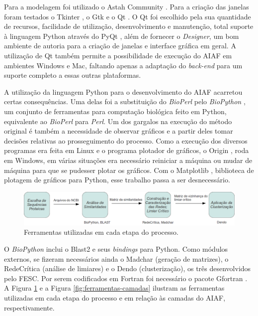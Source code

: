 Para a modelagem foi utilizado o Astah Community \cite{astah}. Para a criação das janelas foram testados o Tkinter \cite{python}, o Gtk \cite{gtk}
e o Qt \cite{qt}. O Qt foi escolhido pela sua quantidade de recursos, facilidade de utilização, desenvolvimento e manutenção, total suporte à
linguagem Python através
do PyQt \cite{pyqt}, além de fornecer o \textit{Designer}, um bom ambiente de autoria para a criação de janelas e interface gráfica em geral.
A utilização de Qt também permite a possibilidade de execução do AIAF em ambientes Windows e Mac,
faltando apenas a adaptação do \textit{back-end} para um suporte completo a essas outras plataformas.

A utilização da linguagem Python para o desenvolvimento do AIAF acarretou certas consequências. Uma delas foi a substituição do \textit{BioPerl} pelo
\textit{BioPython} \cite{biopython}, um conjunto de ferramentas para computação biológica feito em Python, equivalente ao \textit{BioPerl} para \textit{Perl}.
Um dos gargalos na execução do método original é também a necessidade de observar gráficos e a partir deles tomar decisões relativas ao prosseguimento do
processo. Como a execução dos diversos programas era feita em Linux e o programa plotador de gráficos, o Origin \cite{origin}, roda em Windows, em várias
situações era necessário reiniciar a máquina ou mudar de máquina para que se pudesser plotar os gráficos. Com o Matplotlib \cite{matplotlib}, biblioteca de 
plotagem de gráficos para Python, esse trabalho passa a ser desnecessário.

\begin{figure}
\centering
\includegraphics[scale=0.43]{ferramentas-etapa-processo}
\caption{Ferramentas utilizadas em cada etapa do processo.}
\label{fig:ferramentas-etapa-processo}
\end{figure}

O \textit{BioPython} inclui o Blast2 e seus \textit{bindings} para Python. Como módulos externos, se fizeram necessários ainda o Madchar (geração de matrizes),
o RedeCrítica (análise de limiares) e o Dendo (clusterização), os três desenvolvidos pelo FESC.
Por serem codificados em Fortran foi necessário o pacote
Gfortran \cite{gfortran}. A Figura \ref{fig:ferramentas-etapa-processo} e a Figura \ref{fig:ferramentas-camadas}
ilustram as ferramentas utilizadas em cada etapa do processo e em relação às camadas do AIAF, respectivamente.

